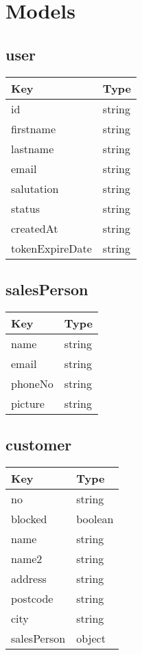 \documentclass[10pt]{article}
\begin{document}
    \section{Models}
            \subsection{user}
            
            \begin{tabularx}{\textwidth}{lZ}
                \textbf{Key} & \textbf{Type} \\
                \hline
                    id & string \\
                    firstname & string \\
                    lastname & string \\
                    email & string \\
                    salutation & string \\
                    status & string \\
                    createdAt & string \\
                    tokenExpireDate & string \\
            \end{tabularx}
            \subsection{salesPerson}
            
            \begin{tabularx}{\textwidth}{lZ}
                \textbf{Key} & \textbf{Type} \\
                \hline
                    name & string \\
                    email & string \\
                    phoneNo & string \\
                    picture & string \\
            \end{tabularx}
            \subsection{customer}
            
            \begin{tabularx}{\textwidth}{lZ}
                \textbf{Key} & \textbf{Type} \\
                \hline
                    no & string \\
                    blocked & boolean \\
                    name & string \\
                    name2 & string \\
                    address & string \\
                    postcode & string \\
                    city & string \\
                    salesPerson & object \\
            \end{tabularx}
\end{document}
